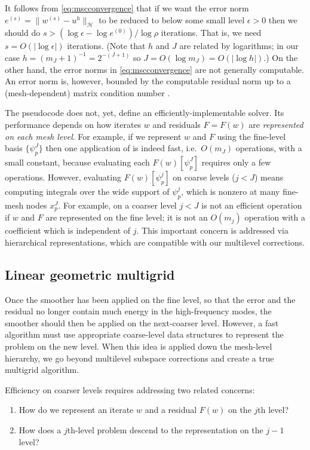 \documentclass[letterpaper,final,12pt,reqno]{amsart}
\theoremstyle{claim}
\newcommand{\eps}{\epsilon}
\numberwithin{equation}{section}
\numberwithin{figure}{section}
\numberwithin{table}{section}
\numberwithin{theorem}{section}
\begin{document}
It follows from \eqref{eq:mscconvergence} that if we want the error norm $e^{(s)} = \|w^{(s)}-u^h\|_{\mathcal{H}}$ to be reduced to below some small level $\eps>0$ then we should do $s>(\log\eps - \log e^{(0)})/\log \rho$ iterations.  That is, we need $s=O(|\log\eps|)$ iterations.  (Note that $h$ and $J$ are related by logarithms; in our case $h=(m_J+1)^{-1}=2^{-(J+1)}$ so $J = O(\log m_J) = O(|\log h|)$.)  On the other hand, the error norms in \eqref{eq:mscconvergence} are not generally computable.  An error norm is, however, bounded by the computable residual norm up to a (mesh-dependent) matrix condition number \cite[Chapter 2]{Bueler2016}.

The pseudocode  does not, yet, define an efficiently-implementable solver.  Its performance depends on how iterates $w$ and residuals $F=F(w)$ are \emph{represented on each mesh level}.  For example, if we represent $w$ and $F$ using the fine-level basis $\{\psi_p^J\}$ then one application of  is indeed fast, i.e.~$O(m_J)$ operations, with a small constant, because evaluating each $F(w)[\psi_p^J]$ requires only a few operations.  However, evaluating $F(w)[\psi_p^j]$ on coarse levels ($j<J$) means computing integrals over the wide support of $\psi_p^j$, which is nonzero at many fine-mesh nodes $x_p^J$.  For example,  on a coarser level $j<J$ is not an efficient operation if $w$ and $F$ are represented on the fine level; it is not an $O(m_j)$ operation with a coefficient which is independent of $j$.  This important concern is addressed via hierarchical representations, which are compatible with our multilevel corrections.

\subsection{Linear geometric multigrid} \label{subsec:gmg}  Once the smoother has been applied on the fine level, so that the error and the residual no longer contain much energy in the high-frequency modes, the smoother should then be applied on the next-coarser level.  However, a fast algorithm must use appropriate coarse-level data structures to represent the problem on the new level.  When this idea is applied down the mesh-level hierarchy, we go beyond multilevel subspace corrections and create a true multigrid algorithm.

Efficiency on coarser levels requires addressing two related concerns:
\renewcommand{\labelenumi}{\emph{\roman{enumi})}}
\begin{enumerate}
\item How do we represent an iterate $w$ and a residual $F(w)$ on the $j$th level?
\item How does a $j$th-level problem descend to the representation on the $j-1$ level?
\end{enumerate}
\end{document}
